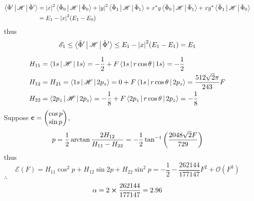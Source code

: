 \documentclass[a4paper]{article}
\begin{document}
\begin{equation}\label{key}
\begin{aligned}
\Braket{\tilde{\Phi}' | \mathscr{H} | \tilde{\Phi}'} &= \abs{x}^2 \Braket{\tilde{\Phi}_0 | \mathscr{H} | \tilde{\Phi}_0} + \abs{y}^2 \Braket{\tilde{\Phi}_1 | \mathscr{H} | \tilde{\Phi}_1} + x^* y \Braket{\tilde{\Phi}_0 | \mathscr{H} | \tilde{\Phi}_1} + x y^* \Braket{\tilde{\Phi}_1 | \mathscr{H} | \tilde{\Phi}_0}\\
&= E_1 - \abs{x}^2(E_1 - E_0)
\end{aligned}
\end{equation}
thus
\begin{equation}\label{key}
\mathscr{E}_1 \leq \Braket{\tilde{\Phi}' | \mathscr{H} | \tilde{\Phi}'} \leq E_1 - \abs{x}^2(E_1-E_1) = E_1
\end{equation}

\begin{equation}\label{key}
\begin{aligned}
H_{11} &= \Braket{1s | \mathscr{H} | 1s} = -\dfrac{1}{2} + F\Braket{1s| r\cos\theta | 1s} = -\dfrac{1}{2}\\
H_{12} &= H_{21} = \Braket{1s | \mathscr{H} | 2p_z} = 0 + F\Braket{1s| r\cos\theta | 2p_z} = \dfrac{512 \sqrt{2} \pi }{243}F\\
H_{22} &= \Braket{2p_z | \mathscr{H} | 2p_z} = -\dfrac{1}{8} + F\Braket{2p_z| r\cos\theta | 2p_z} = -\dfrac{1}{8}
\end{aligned}
\end{equation}
Suppose $ \vb{c} = \mqty(\cos p\\ \sin p) $,
\begin{equation}\label{key}
p = \dfrac{1}{2}\arctan\dfrac{2H_{12}}{H_{11} - H_{22}} = -\dfrac{1}{2} \tan ^{-1}\qty(\dfrac{2048 \sqrt{2} F}{729})
\end{equation}
thus
\begin{equation}\label{key}
\mathscr{E}(F) = H_{11}\cos^2 p + H_{12}\sin 2p + H_{22}\sin^2 p = -\dfrac{1}{2}-\dfrac{262144}{177147}F^2+\mathcal{O}(F^3)
\end{equation}
$ \therefore $
\begin{equation}\label{key}
\alpha = 2\cross\dfrac{262144}{177147} = 2.96
\end{equation}
\end{document}
